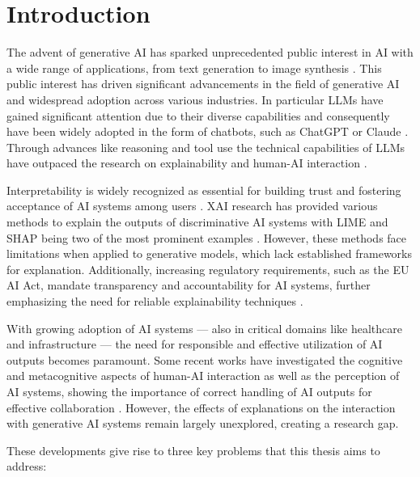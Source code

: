 \section{Introduction} \label{sec:introduction}

The advent of generative \ac{AI} has sparked unprecedented public interest in \ac{AI} with a wide range of applications, from text generation to image synthesis \parencite{OpenAI2022,Rombach2021}. This public interest has driven significant advancements in the field of generative \ac{AI} and widespread adoption across various industries. In particular \acp{LLM} have gained significant attention due to their diverse capabilities and consequently have been widely adopted in the form of chatbots, such as ChatGPT \parencite{OpenAI2025} or Claude \parencite{AnthropicInc2025}. Through advances like reasoning and tool use the technical capabilities of \acp{LLM} have outpaced the research on explainability and human-\ac{AI} interaction \parencite{OpenAI2024a, AnthropicInc2024}.

Interpretability is widely recognized as essential for building trust and fostering acceptance of \ac{AI} systems among users \parencite{Arrieta2020,Shin2021}. \ac{XAI} research has provided various methods to explain the outputs of discriminative \ac{AI} systems with LIME and SHAP being two of the most prominent examples \parencite{Ribeiro2016,Lundberg2017}. However, these methods face limitations when applied to generative models, which lack established frameworks for explanation. Additionally, increasing regulatory requirements, such as the \ac{EU} AI Act, mandate transparency and accountability for \ac{AI} systems, further emphasizing the need for reliable explainability techniques \parencite{EuropeanUnion2024}.

With growing adoption of \ac{AI} systems — also in critical domains like healthcare and infrastructure — the need for responsible and effective utilization of \ac{AI} outputs becomes paramount. Some recent works have investigated the cognitive and metacognitive aspects of human-\ac{AI} interaction as well as the perception of \ac{AI} systems, showing the importance of correct handling of \ac{AI} outputs for effective collaboration \parencite{Jussupow2021,Kazemitabaar2024}. However, the effects of explanations on the interaction with generative \ac{AI} systems remain largely unexplored, creating a research gap.

These developments give rise to three key problems that this thesis aims to address:

